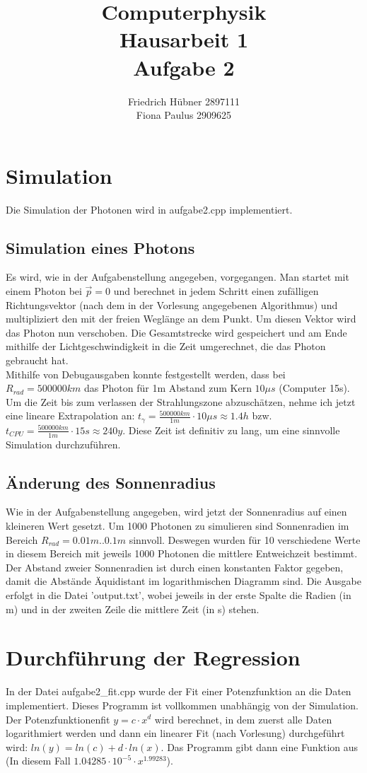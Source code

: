 \documentclass{scrartcl}
\author{Friedrich Hübner 2897111\\
Fiona Paulus 2909625}
\title{Computerphysik\\Hausarbeit 1\\Aufgabe 2}
\begin{document}
\maketitle
\newpage

\section{Simulation}
Die Simulation der Photonen wird in aufgabe2.cpp implementiert.
\subsection{Simulation eines Photons}
Es wird, wie in der Aufgabenstellung angegeben, vorgegangen. Man startet mit einem Photon bei $\vec{p} = 0$ und berechnet in jedem Schritt einen zufälligen Richtungsvektor (nach dem in der Vorlesung angegebenen Algorithmus) und multipliziert den mit der freien Weglänge an dem Punkt. Um diesen Vektor wird das Photon nun verschoben. Die Gesamtstrecke wird gespeichert und am Ende mithilfe der Lichtgeschwindigkeit in die Zeit umgerechnet, die das Photon gebraucht hat.\\
Mithilfe von Debugausgaben konnte festgestellt werden, dass bei $R_{rad} = 500000km$ das Photon für 1m Abstand zum Kern $10\mu s$ (Computer 15s). Um die Zeit bis zum verlassen der Strahlungszone abzuschätzen, nehme ich jetzt eine lineare Extrapolation an: $t_\gamma = \frac{500000km}{1m} \cdot 10\mu s \approx 1.4 h$ bzw. $t_{CPU} = \frac{500000km}{1m} \cdot 15s \approx 240y$. Diese Zeit ist definitiv zu lang, um eine sinnvolle Simulation durchzuführen.  

\subsection{Änderung des Sonnenradius}
Wie in der Aufgabenstellung angegeben, wird jetzt der Sonnenradius auf einen kleineren Wert gesetzt. Um 1000 Photonen zu simulieren sind Sonnenradien im Bereich $R_{rad} = 0.01m..0.1m$ sinnvoll. Deswegen wurden für 10 verschiedene Werte in diesem Bereich mit jeweils 1000 Photonen die mittlere Entweichzeit bestimmt. Der Abstand zweier Sonnenradien ist durch einen konstanten Faktor gegeben, damit die Abstände Äquidistant im logarithmischen Diagramm sind. Die Ausgabe erfolgt in die Datei 'output.txt', wobei jeweils in der erste Spalte die Radien (in m) und in der zweiten Zeile die mittlere Zeit (in s) stehen. 

\section{Durchführung der Regression}
In der Datei aufgabe2\_fit.cpp wurde der Fit einer Potenzfunktion an die Daten implementiert. Dieses Programm ist vollkommen unabhängig von der Simulation. Der Potenzfunktionenfit $y = c\cdot x^d$ wird berechnet, in dem zuerst alle Daten logarithmiert werden und dann ein linearer Fit (nach Vorlesung) durchgeführt wird: $ln(y) = ln(c) + d \cdot ln(x)$. Das Programm gibt dann eine Funktion aus (In diesem Fall $1.04285\cdot 10^{-5}\cdot x^{1.99283}$).\\
\end{document}
